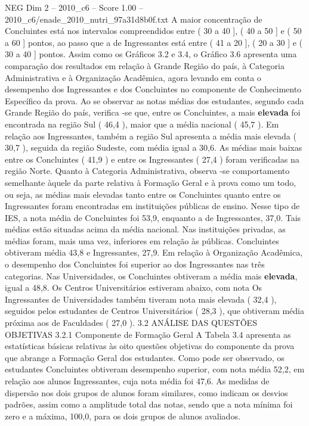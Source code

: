 \begin{textsample}{NEG Dim 2 – 2010\_c6 – Score 1.00 – 2010\_c6/enade\_2010\_nutri\_97a31d8b0f.txt}
A maior concentração de Concluintes está nos intervalos compreendidos entre ( 30 a 40 ], ( 40 a 50 ] e ( 50 a 60 ] pontos, ao passo que a de Ingressantes está entre ( 41 a 20 ], ( 20 a 30 ] e ( 30 a 40 ] pontos.
Assim como os Gráficos 3.2 e 3.4, o Gráfico 3.6 apresenta uma comparação dos resultados em relação à Grande Região do país, à Categoria Administrativa e à Organização Acadêmica, agora levando em conta o desempenho dos Ingressantes e dos Concluintes no componente de Conhecimento Específico da prova.
Ao se observar as notas médias dos estudantes, segundo cada Grande Região do país, verifica -se que, entre os Concluintes, a mais \textbf{elevada} foi encontrada na região Sul ( 46,4 ), maior que a média nacional ( 45,7 ).
Em relação aos Ingressantes, também a região Sul apresenta a média mais elevada ( 30,7 ), seguida da região Sudeste, com média igual a 30,6.
As médias mais baixas entre os Concluintes ( 41,9 ) e entre os Ingressantes ( 27,4 ) foram verificadas na região Norte.
Quanto à Categoria Administrativa, observa -se comportamento semelhante àquele da parte relativa à Formação Geral e à prova como um todo, ou seja, as médias mais elevadas tanto entre os Concluintes quanto entre os Ingressantes foram encontradas em instituições públicas de ensino.
Nesse tipo de IES, a nota média de Concluintes foi 53,9, enquanto a de Ingressantes, 37,0.
Tais médias estão situadas acima da média nacional.
Nas instituições privadas, as médias foram, mais uma vez, inferiores em relação às públicas.
Concluintes obtiveram média 43,8 e Ingressantes, 27,9.
Em relação à Organização Acadêmica, o desempenho dos Concluintes foi superior ao dos Ingressantes nas três categorias.
Nas Universidades, os Concluintes obtiveram a média mais \textbf{elevada}, igual a 48,8.
Os Centros Universitários estiveram abaixo, com nota Os Ingressantes de Universidades também tiveram nota mais elevada ( 32,4 ), seguidos pelos estudantes de Centros Universitários ( 28,3 ), que obtiveram média próxima aos de Faculdades ( 27,0 ). 3.2 ANÁLISE DAS QUESTÕES OBJETIVAS 3.2.1 Componente de Formação Geral A Tabela 3.4 apresenta as estatísticas básicas relativas às oito questões objetivas do componente da prova que abrange a Formação Geral dos estudantes.
Como pode ser observado, os estudantes Concluintes obtiveram desempenho superior, com nota média 52,2, em relação aos alunos Ingressantes, cuja nota média foi 47,6.
As medidas de dispersão nos dois grupos de alunos foram similares, como indicam os desvios padrões, assim como a amplitude total das notas, sendo que a nota mínima foi zero e a máxima, 100,0, para os dois grupos de alunos avaliados.

\end{textsample}
